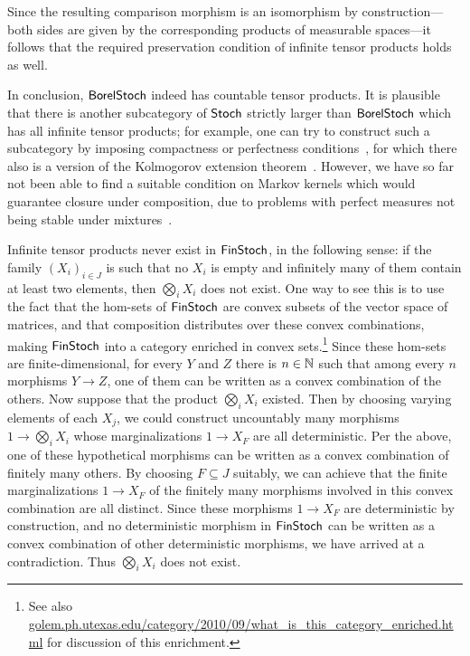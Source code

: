 \documentclass[11pt]{article}
\begin{document}
\begin{example}
	Since the resulting comparison morphism  is an isomorphism by construction---both sides are given by the corresponding products of measurable spaces---it follows that the required preservation condition of infinite tensor products holds as well.

	In conclusion, $\operatorname{\mathsf{BorelStoch}}$ indeed has countable tensor products. It is plausible that there is another subcategory of $\operatorname{\mathsf{Stoch}}$ strictly larger than $\operatorname{\mathsf{BorelStoch}}$ which has all infinite tensor products; for example, one can try to construct such a subcategory by imposing compactness or perfectness conditions~\cite[\S{451}]{fremlin4}, for which there also is a version of the Kolmogorov extension theorem~\cite[Corollary~454G]{fremlin4}. However, we have so far not been able to find a suitable condition on Markov kernels which would guarantee closure under composition, due to problems with perfect measures not being stable under mixtures~\cite{ramachandran}.
\end{example}

\begin{example}
	\label{infprods_finstoch}
	Infinite tensor products never exist in $\operatorname{\mathsf{FinStoch}}$, in the following sense: if the family $(X_i)_{i \in J}$ is such that no $X_i$ is empty and infinitely many of them contain at least two elements, then $\bigotimes_i X_i$ does not exist. One way to see this is to use the fact that the hom-sets of $\operatorname{\mathsf{FinStoch}}$ are convex subsets of the vector space of matrices, and that composition distributes over these convex combinations, making $\operatorname{\mathsf{FinStoch}}$ into a category enriched in convex sets.\footnote{See also \href{https://golem.ph.utexas.edu/category/2010/09/what_is_this_category_enriched.html}{golem.ph.utexas.edu/category/2010/09/what\_is\_this\_category\_enriched.html} for discussion of this enrichment.} Since these hom-sets are finite-dimensional, for every $Y$ and $Z$ there is $n \in \mathbb{N}$ such that among every $n$ morphisms $Y \to Z$, one of them can be written as a convex combination of the others. Now suppose that the product $\bigotimes_i X_i$ existed. Then by choosing varying elements of each $X_j$, we could construct uncountably many morphisms $1 \to \bigotimes_i X_i$ whose marginalizations $1 \to X_F$ are all deterministic. Per the above, one of these hypothetical morphisms can be written as a convex combination of finitely many others. By choosing $F \subseteq J$ suitably, we can achieve that the finite marginalizations $1 \to X_F$ of the finitely many morphisms involved in this convex combination are all distinct. Since these morphisms $1 \to X_F$ are deterministic by construction, and no deterministic morphism in $\operatorname{\mathsf{FinStoch}}$ can be written as a convex combination of other deterministic morphisms, we have arrived at a contradiction. Thus $\bigotimes_i X_i$ does not exist.
\end{example}
\end{document}
